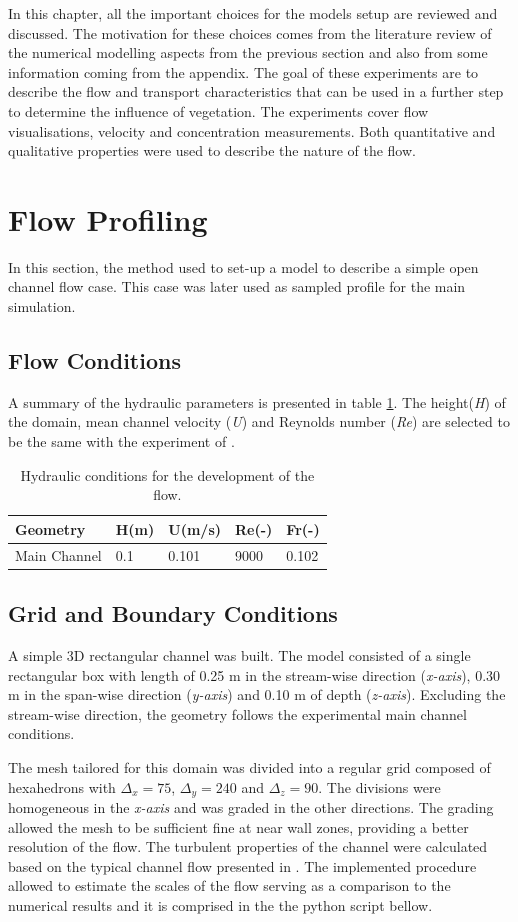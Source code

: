 \documentclass[../main.tex]{subfiles}
\begin{document}
In this chapter, all the important choices for the models setup are reviewed and discussed. The motivation for
these choices comes from the literature review of the numerical modelling aspects from the previous section
and also from some information coming from the appendix. The goal of these experiments are to describe the flow and transport characteristics that can be used in a further step to determine the influence of vegetation. The experiments cover flow visualisations, velocity and concentration measurements. Both quantitative and qualitative properties were used to describe the nature of the flow.

\section{Flow Profiling}
In this section, the method used to set-up a model to describe a simple open channel flow case. This case was later used as sampled profile for the main simulation.
\subsection{Flow Conditions}
\label{sec:flowConditions}
A summary of the hydraulic parameters is presented in table \ref{tab:inlet}. The height(\textit{H}) of the domain, mean channel velocity (\textit{U}) and Reynolds number (\textit{Re}) are selected to be the same with the experiment of \textcite{xiang2019}.
\begin{table}[]
\centering
\caption{Hydraulic conditions for the development of the flow.}
\label{tab:inlet}
\begin{tabular}{lllll}
Geometry     & H(m) & U(m/s) & Re(-) & Fr(-) \\ \hline
Main Channel & 0.1  & 0.101  & 9000  & 0.102
\end{tabular}
\end{table}

\subsection{Grid and Boundary Conditions}
A simple 3D rectangular channel was built. The model consisted of a single rectangular box with length of 0.25 m in the stream-wise direction (\textit{x-axis}), 0.30 m in the span-wise direction (\textit{y-axis}) and 0.10 m of depth (\textit{z-axis}). Excluding the stream-wise direction, the geometry follows the experimental main channel conditions.

The mesh tailored for this domain was divided into a regular grid composed of hexahedrons with $\Delta_x =75$, $\Delta_y = 240$ and $\Delta_z = 90$. The divisions were homogeneous in the \textit{x-axis} and was graded in the other directions. The grading allowed the mesh to be sufficient fine at near wall zones, providing a better resolution of the flow. The turbulent properties of the channel were calculated based on the typical channel flow presented in \textcite{Pope2000}. The implemented procedure allowed to estimate the scales of the flow serving as a comparison to the numerical results and it is comprised in the the python script bellow.
\end{document}
